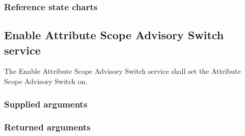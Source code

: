 \begin{compactstdpage}
    \subsubsection{Reference state charts}


    \subsection{Enable Attribute Scope Advisory Switch service}

    The Enable Attribute Scope Advisory Switch service shall set the Attribute Scope Advisory Switch on.

    \subsubsection{Supplied arguments}


    \subsubsection{Returned arguments}

\end{compactstdpage}

\clearpage

